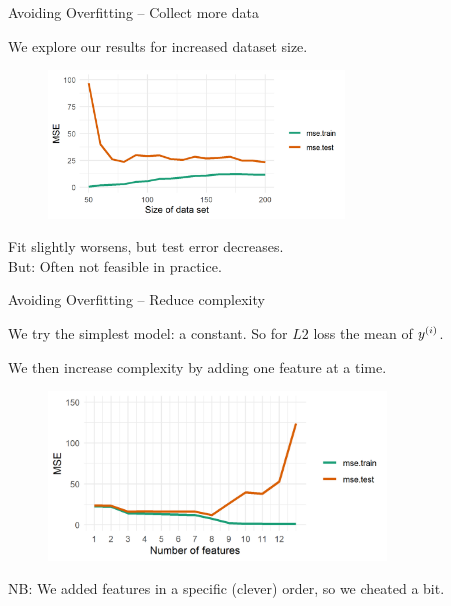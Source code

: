\documentclass[11pt,compress,t,notes=noshow, xcolor=table]{beamer}
\begin{document}
\begin{vbframe}{Avoiding Overfitting -- Collect more data}

\lz 

We explore our results for increased dataset size.


\begin{figure}
\includegraphics[width=0.7\textwidth]{figure/avoid_overfitting_01.png}\\
\end{figure}

Fit slightly worsens, but test error decreases.\\
But: Often not feasible in practice.

\end{vbframe}

\begin{vbframe}{Avoiding Overfitting -- Reduce complexity}


We try the simplest model: a constant. So for $L2$ loss the mean of $y^{(i)}$.

\lz 

We then increase complexity by adding one feature at a time.


\begin{figure}
\includegraphics[width=0.8\textwidth]{figure/avoid_overfitting_02.png}\\
\end{figure}


\begin{footnotesize}
NB: We added features in a specific (clever) order, so we cheated a bit.
\end{footnotesize}

\end{vbframe}
\end{document}
